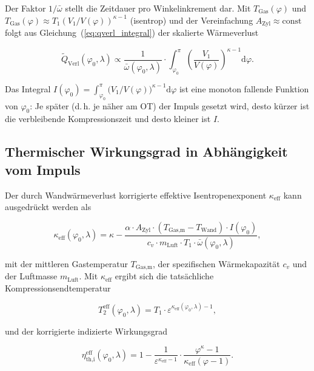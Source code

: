 ﻿\documentclass[a4paper,12pt]{article}
\begin{document}
Der Faktor $1/\bar{\omega}$ stellt die Zeitdauer pro Winkelinkrement dar. Mit $T_\text{Gas}(\varphi)$ und $T_\text{Gas}(\varphi) \approx T_1 (V_1/V(\varphi))^{\kappa-1}$ (isentrop)
und der Vereinfachung $A_\text{Zyl} \approx \text{const}$ folgt aus
Gleichung~(\ref{eq:qverl_integral}) der skalierte Wärmeverlust

\begin{equation}
  \tilde{Q}_\text{Verl}(\varphi_0, \lambda) \propto
    \frac{1}{\bar{\omega}(\varphi_0, \lambda)} \cdot
    \int_{\varphi_0}^{\pi}
      \left(\frac{V_1}{V(\varphi)}\right)^{\!\kappa-1}
    \mathrm{d}\varphi.
  \label{eq:qverl_skaliert}
\end{equation}

Das Integral $I(\varphi_0) = \int_{\varphi_0}^{\pi}
\!\bigl(V_1/V(\varphi)\bigr)^{\kappa-1}\mathrm{d}\varphi$ ist eine monoton fallende
Funktion von $\varphi_0$: Je später (d.\,h. je näher am OT) der Impuls gesetzt wird,
desto kürzer ist die verbleibende Kompressionszeit und desto kleiner ist $I$.

\subsection{Thermischer Wirkungsgrad in Abhängigkeit vom Impuls}

Der durch Wandwärmeverlust korrigierte effektive Isentropenexponent
$\kappa_\text{eff}$ kann ausgedrückt werden als

\begin{equation}
  \kappa_\text{eff}(\varphi_0, \lambda) = \kappa -
    \frac{\alpha \cdot A_\text{Zyl} \cdot (T_\text{Gas,m} - T_\text{Wand})
          \cdot I(\varphi_0)}{c_v \cdot m_\text{Luft} \cdot T_1 \cdot
          \bar{\omega}(\varphi_0,\lambda)},
  \label{eq:kappa_eff}
\end{equation}

\noindent
mit der mittleren Gastemperatur $T_\text{Gas,m}$, der spezifischen Wärmekapazität
$c_v$ und der Luftmasse $m_\text{Luft}$. Mit $\kappa_\text{eff}$ ergibt sich die
tatsächliche Kompressionsendtemperatur

\begin{equation}
  T_2^\text{eff}(\varphi_0, \lambda)
    = T_1 \cdot \varepsilon^{\kappa_\text{eff}(\varphi_0,\lambda) - 1},
  \label{eq:T2eff}
\end{equation}

und der korrigierte indizierte Wirkungsgrad

\begin{equation}
  \eta_\text{th,i}^\text{eff}(\varphi_0, \lambda)
    = 1 - \frac{1}{\varepsilon^{\kappa_\text{eff}-1}} \cdot
      \frac{\varphi^\kappa - 1}{\kappa_\text{eff}(\varphi - 1)}.
  \label{eq:eta_th_eff}
\end{equation}
\end{document}
